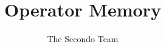 \documentclass{article}
\title{Operator Memory}
\author{The Secondo Team}
\begin{document}
\maketitle
\begin{center}

\end{center}
\end{document}

